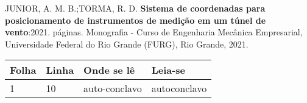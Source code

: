   \noindent JUNIOR, A. M. B.;TORMA, R. D. \textbf{Sistema de coordenadas para posicionamento de instrumentos de medição em um túnel de vento}:2021. \pageref{LastPage} páginas. Monografia - Curso de Engenharia Mecânica Empresarial, Universidade Federal do Rio Grande (FURG), Rio Grande, 2021.
  
\begin{table}[h!]
	\center
	\begin{tabular}{|p{1.4cm}|p{1cm}|p{3cm}|p{3cm}|}
		\hline
		\textbf{Folha} & \textbf{Linha} & \textbf{Onde se lê} &
		\textbf{Leia-se}\\
		\hline
		1 & 10 & auto-conclavo & autoconclavo\\
		\hline
	\end{tabular}
\end{table}